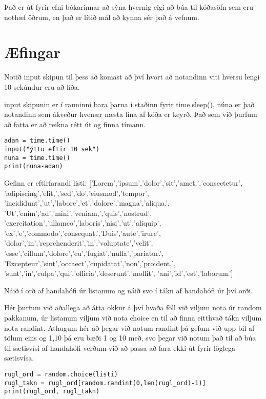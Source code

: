 Það er út fyrir efni bókarinnar að sýna hvernig eigi að búa til kóðasöfn sem eru nothæf öðrum, en það er lítið mál að kynna sér það á vefnum.

\newpage
\section{Æfingar}

\begin{exercise}\label{imp1}
Notið input skipun til þess að komast að því hvort að notandinn viti hversu lengi 10 sekúndur eru að líða. 
\end{exercise}
\begin{Answer}[ref={imp1}]
input skipunin er í rauninni bara þarna í staðinn fyrir time.sleep(), núna er það notandinn sem ákveður hvenær næsta lína af kóða er keyrð.
Það sem við þurfum að fatta er að reikna rétt út og finna tímann.
	\begin{lstlisting}
adan = time.time()
input("ýttu eftir 10 sek")
nuna = time.time()
print(nuna-adan)\end{lstlisting}
\end{Answer}


\begin{exercise}\label{imp2}
Gefinn er eftirfarandi listi: 
['Lorem','ipsum','dolor','sit','amet,','consectetur',
'adipiscing','elit,','sed','do','eiusmod','tempor',
'incididunt','ut','labore','et','dolore','magna','aliqua.',
'Ut','enim','ad','mini','veniam,','quis','nostrud',
'exercitation','ullamco','laboris','nisi','ut','aliquip',
'ex','e','commodo','consequat.','Duis','aute','irure',
'dolor','in','reprehenderit','in','voluptate','velit',
'esse','cillum','dolore','eu','fugiat','nulla','pariatur.',
'Excepteur','sint','occaect','cupidatat','non','proident,',
'sunt','in','culpa','qui','officia','deserunt','mollit',
'ani','id','est','laborum.']

Náið í orð af handahófi úr listanum og náið svo í tákn af handahófi úr því orði.
\end{exercise}
\begin{Answer}[ref={imp2}]
Hér þurfum við aðallega að átta okkur á því hvaða föll við viljum nota úr random pakkanum, úr listanum viljum við nota choice en til að finna eitthvað tákn viljum nota randint.
Athugum hér að þegar við notum randint þá gefum við upp bil af tölum eins og 1,10 þá eru bæði 1 og 10 með, svo þegar við notum það til að búa til sætisvísi af handahófi verðum við að passa að fara ekki út fyrir löglega sætisvísa.
	\begin{lstlisting}
rugl_ord = random.choice(listi)
rugl_takn = rugl_ord[random.randint(0,len(rugl_ord)-1)]
print(rugl_ord, rugl_takn)\end{lstlisting}
\end{Answer}